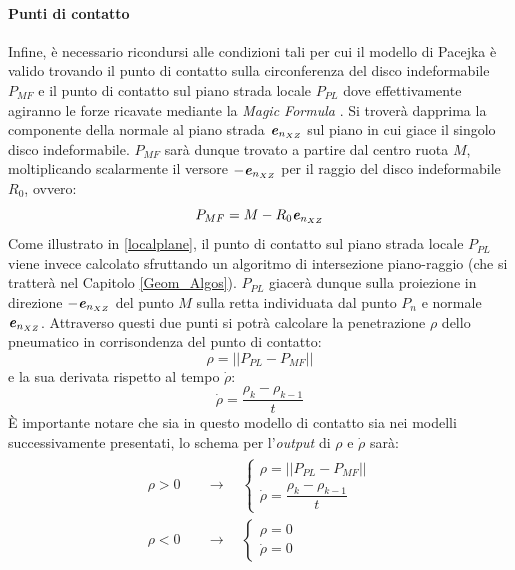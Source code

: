 \paragraph{Punti di contatto}
\label{Punti_contatto_rill}
Infine, è necessario ricondursi alle condizioni tali per cui il modello di Pacejka è valido trovando il punto di contatto sulla circonferenza del disco indeformabile $P_{MF}$ e il punto di contatto sul piano strada locale $P_{PL}$ dove effettivamente agiranno le forze ricavate mediante la \textit{Magic Formula} \cite{hans}. Si troverà dapprima la componente della normale al piano strada $\textbf{\textit{e}}_{n_{XZ}}$ sul piano in cui giace il singolo disco indeformabile. $P_{MF}$ sarà dunque trovato a partire dal centro ruota $M$, moltiplicando scalarmente il versore $-\textbf{\textit{e}}_{n_{XZ}}$ per il raggio del disco indeformabile $R_0$, ovvero:
%
\begin{equation}
P_{MF} = M-R_0\textbf{\textit{e}}_{n_{XZ}}
\label{puntoMF}
\end{equation}
%
Come illustrato in \figurename{ \ref{localplane}}, il punto di contatto sul piano strada locale $P_{PL}$ viene invece calcolato sfruttando un algoritmo di intersezione piano-raggio (che si tratterà nel Capitolo \ref{Geom_Algos}). $P_{PL}$ giacerà dunque sulla proiezione in direzione $-\textbf{\textit{e}}_{n_{XZ}}$ del punto $M$ sulla retta individuata dal punto $P_n$ e normale $\textbf{\textit{e}}_{n_{XZ}}$. Attraverso questi due punti si potrà calcolare la penetrazione $\rho$ dello pneumatico in corrisondenza del punto di contatto:
\begin{equation}
\rho = \left|\left| P_{PL}-P_{MF} \right|\right|
\end{equation}
e la sua derivata rispetto al tempo $\dot{\rho}$:
\begin{equation}
\dot{\rho} = \dfrac{\rho_k-\rho_{k-1}}{t}
\end{equation}
È importante notare che sia in questo modello di contatto sia nei modelli successivamente presentati, lo schema per l'\textit{output} di $\rho $ e $\dot{\rho}$ sarà:
\begin{equation}
\begin{split}
\begin{aligned}
\rho > 0 &\quad \rightarrow \quad \begin{cases}
\rho = \left|\left| P_{PL}-P_{MF} \right|\right|\\
\dot{\rho} = \dfrac{\rho_k-\rho_{k-1}}{t}
\end{cases}\\
\rho < 0 &\quad \rightarrow \quad \begin{cases}
\rho = 0\\
\dot{\rho} = 0
\end{cases}
\end{aligned}
\end{split}
\end{equation}

